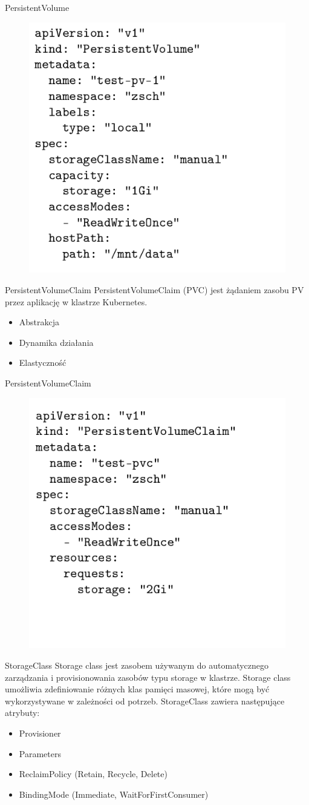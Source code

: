 \documentclass[polish,envcountsect,10pt]{beamer}
\begin{document}
\begin{frame}{PersistentVolume}
	\begin{figure}[H]
    	\includegraphics[width=0.5\linewidth]{images/pv.png}
	\end{figure}
\end{frame}

\begin{frame}{PersistentVolumeClaim}
	PersistentVolumeClaim (PVC) jest żądaniem zasobu PV przez aplikację w klastrze Kubernetes.
	\begin{itemize}
		\item Abstrakcja
		\item Dynamika działania
		\item Elastyczność
	\end{itemize}
\end{frame}

\begin{frame}{PersistentVolumeClaim}
	\begin{figure}[H]
    	\includegraphics[width=0.5\linewidth]{images/pvc.png}
	\end{figure}
\end{frame}

\begin{frame}{StorageClass}
	Storage class jest zasobem używanym do automatycznego zarządzania i provisionowania zasobów typu storage w klastrze. Storage class umożliwia zdefiniowanie różnych klas pamięci masowej, które mogą być wykorzystywane w zależności od potrzeb. StorageClass zawiera następujące atrybuty:
	\begin{itemize}
		\item Provisioner
		\item Parameters
		\item ReclaimPolicy (Retain, Recycle, Delete)
		\item BindingMode (Immediate, WaitForFirstConsumer)
	\end{itemize}
\end{frame}
\end{document}
